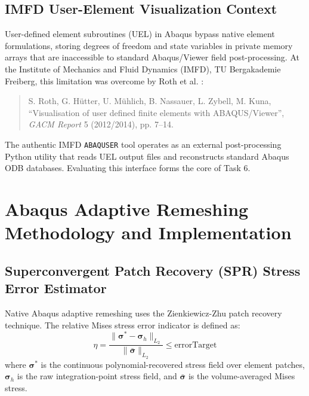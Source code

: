 \documentclass[11pt,a4paper]{report}
\begin{document}
\section{IMFD User-Element Visualization Context}
User-defined element subroutines (UEL) in Abaqus bypass native element formulations, storing degrees of freedom and state variables in private memory arrays that are inaccessible to standard Abaqus/Viewer field post-processing. At the Institute of Mechanics and Fluid Dynamics (IMFD), TU Bergakademie Freiberg, this limitation was overcome by Roth et al. \cite{roth2012}:
\begin{quote}
\small S. Roth, G. H\"utter, U. M\"uhlich, B. Nassauer, L. Zybell, M. Kuna, ``Visualisation of user defined finite elements with ABAQUS/Viewer'', \textit{GACM Report} 5 (2012/2014), pp. 7--14.
\end{quote}
The authentic IMFD \texttt{ABAQUSER} tool operates as an external post-processing Python utility that reads UEL output files and reconstructs standard Abaqus ODB databases. Evaluating this interface forms the core of Task 6.

\chapter{Abaqus Adaptive Remeshing Methodology and Implementation}
\label{chap:methodology}

\section{Superconvergent Patch Recovery (SPR) Stress Error Estimator}
Native Abaqus adaptive remeshing uses the Zienkiewicz-Zhu patch recovery technique. The relative Mises stress error indicator is defined as:
\begin{equation}
\label{eq:miseseri}
\eta = \frac{\| \boldsymbol{\sigma}^* - \boldsymbol{\sigma}_h \|_{L_2}}{\| \bar{\boldsymbol{\sigma}} \|_{L_2}} \le \text{errorTarget}
\end{equation}
where $\boldsymbol{\sigma}^*$ is the continuous polynomial-recovered stress field over element patches, $\boldsymbol{\sigma}_h$ is the raw integration-point stress field, and $\bar{\boldsymbol{\sigma}}$ is the volume-averaged Mises stress.
\end{document}
